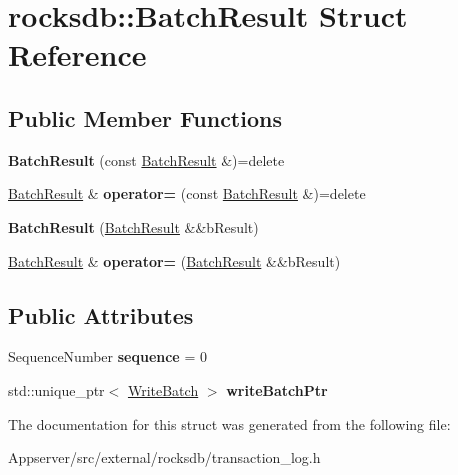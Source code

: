 \hypertarget{structrocksdb_1_1BatchResult}{}\section{rocksdb\+:\+:Batch\+Result Struct Reference}
\label{structrocksdb_1_1BatchResult}
\subsection*{Public Member Functions}
\begin{DoxyCompactItemize}
\item 
{\bfseries Batch\+Result} (const \hyperlink{structrocksdb_1_1BatchResult}{Batch\+Result} \&)=delete\hypertarget{structrocksdb_1_1BatchResult_ab8732507130b0933bed3ceb2cc2e10d2}{}\label{structrocksdb_1_1BatchResult_ab8732507130b0933bed3ceb2cc2e10d2}

\item 
\hyperlink{structrocksdb_1_1BatchResult}{Batch\+Result} \& {\bfseries operator=} (const \hyperlink{structrocksdb_1_1BatchResult}{Batch\+Result} \&)=delete\hypertarget{structrocksdb_1_1BatchResult_ad670fc1f443c873b2894c2012f453d2f}{}\label{structrocksdb_1_1BatchResult_ad670fc1f443c873b2894c2012f453d2f}

\item 
{\bfseries Batch\+Result} (\hyperlink{structrocksdb_1_1BatchResult}{Batch\+Result} \&\&b\+Result)\hypertarget{structrocksdb_1_1BatchResult_a6407a36281a89a9d84ee0d1a14484c2b}{}\label{structrocksdb_1_1BatchResult_a6407a36281a89a9d84ee0d1a14484c2b}

\item 
\hyperlink{structrocksdb_1_1BatchResult}{Batch\+Result} \& {\bfseries operator=} (\hyperlink{structrocksdb_1_1BatchResult}{Batch\+Result} \&\&b\+Result)\hypertarget{structrocksdb_1_1BatchResult_ad66b55d911c15a8462ee1fc027049c8a}{}\label{structrocksdb_1_1BatchResult_ad66b55d911c15a8462ee1fc027049c8a}

\end{DoxyCompactItemize}
\subsection*{Public Attributes}
\begin{DoxyCompactItemize}
\item 
Sequence\+Number {\bfseries sequence} = 0\hypertarget{structrocksdb_1_1BatchResult_a8a072e4c46c499c9aeab09f5f15724ad}{}\label{structrocksdb_1_1BatchResult_a8a072e4c46c499c9aeab09f5f15724ad}

\item 
std\+::unique\+\_\+ptr$<$ \hyperlink{classrocksdb_1_1WriteBatch}{Write\+Batch} $>$ {\bfseries write\+Batch\+Ptr}\hypertarget{structrocksdb_1_1BatchResult_a6873e4961934136bf279dc929235e9e9}{}\label{structrocksdb_1_1BatchResult_a6873e4961934136bf279dc929235e9e9}

\end{DoxyCompactItemize}


The documentation for this struct was generated from the following file\+:\begin{DoxyCompactItemize}
\item 
Appserver/src/external/rocksdb/transaction\+\_\+log.\+h\end{DoxyCompactItemize}
